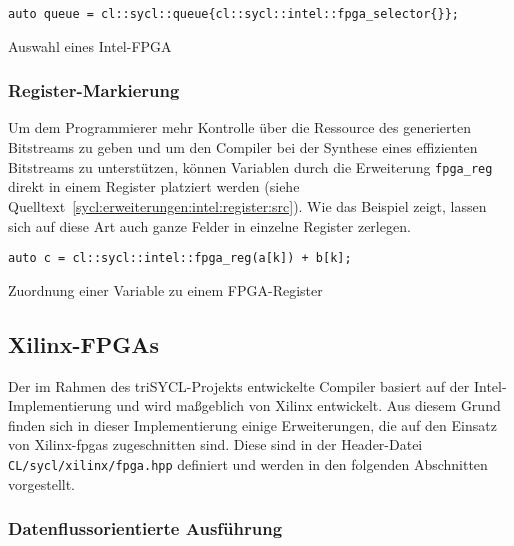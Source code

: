 \begin{code}
    \begin{verbatim}
auto queue = cl::sycl::queue{cl::sycl::intel::fpga_selector{}};
    \end{verbatim}
    \caption{Auswahl eines Intel-FPGA}
    \label{sycl:erweiterungen:intel:selector:src}
\end{code}

\subsubsection{Register-Markierung}\label{sycl:erweiterungen:intel:register}

Um dem Programmierer mehr Kontrolle über die Ressource des generierten
Bitstreams zu geben und um den Compiler bei der Synthese eines effizienten
Bitstreams zu unterstützen, können Variablen durch die Erweiterung
\texttt{fpga\_reg} direkt in einem Register platziert werden (siehe
Quelltext~\ref{sycl:erweiterungen:intel:register:src}). Wie das Beispiel zeigt,
lassen sich auf diese Art auch ganze Felder in einzelne Register zerlegen.

\begin{code}
    \begin{verbatim}
auto c = cl::sycl::intel::fpga_reg(a[k]) + b[k];
    \end{verbatim}
    \caption{Zuordnung einer Variable zu einem FPGA-Register}
    \label{sycl:erweiterungen:intel:register:src}
\end{code}

\subsection{Xilinx-FPGAs}\label{sycl:erweiterungen:xilinx}

Der im Rahmen des triSYCL-Projekts entwickelte Compiler basiert auf der
Intel-Implementierung und wird maßgeblich von Xilinx entwickelt. Aus diesem
Grund finden sich in dieser Implementierung einige Erweiterungen, die auf den
Einsatz von Xilinx-\gls{fpga}s zugeschnitten sind. Diese sind in der
Header-Datei \texttt{CL/sycl/xilinx/fpga.hpp} definiert und werden in den
folgenden Abschnitten vorgestellt.

\subsubsection{Datenflussorientierte Ausführung}
\label{sycl:erweiterungen:xilinx:dataflow}

